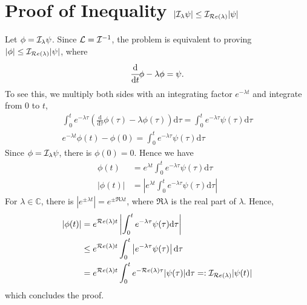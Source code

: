 \section{Proof of Inequality $|\mathcal{I}_\lambda \psi| \leq \mathcal{I}_{\mathcal{R}e\left(\lambda\right)}|\psi|$}
    Let $\phi = \mathcal{I}_\lambda \psi$. Since $\mathcal{L} = \mathcal{I}^{-1}$, the problem is equivalent to proving $|\phi| \leq \mathcal{I}_{\mathcal{R}e\left(\lambda\right)}|\psi|$, where
    \begin{equation}
        \cfrac{\mathrm{d} }{\mathrm{d} t}\phi-\lambda\phi = \psi.
    \end{equation}
    To see this, we multiply both sides with an integrating factor $e^{-\lambda t}$ and integrate from $0$ to $t$,
    \begin{gather}
        \int_{0}^{t} e^{-\lambda \tau} \left(\frac{\mathrm{d}}{\mathrm{d}\tau}\phi(\tau)-\lambda\phi(\tau)\right)\mathrm{d}\tau = \int_{0}^{t} e^{-\lambda \tau}\psi(\tau) \mathrm{d}\tau\\
        e^{-\lambda t}\phi(t) - \phi(0) = \int_{0}^{t} e^{-\lambda \tau}\psi(\tau) \mathrm{d}\tau
    \end{gather}
    Since $\phi = \mathcal{I}_{\lambda} \psi$, there is $\phi(0) = 0$. Hence we have
    \begin{align}
        \phi(t) &= e^{\lambda t}\int_{0}^{t} e^{-\lambda \tau}\psi(\tau) \mathrm{d}\tau \\
        |\phi(t)| &= \left|e^{\lambda t}\int_{0}^{t} e^{-\lambda \tau}\psi(\tau) \mathrm{d}\tau\right|
    \end{align}
    For $\lambda \in \mathbb{C}$, there is $\left|e^{\pm \lambda t}\right| = e^{\pm \Re{\lambda} t}$, where $\Re{\lambda}$ is the real part of $\lambda$.
    Hence,
    \begin{align}
        |\phi(t)| &= e^{\mathcal{R}e\left(\lambda\right) t} \left|\int_{0}^{t} e^{-\lambda \tau}\psi(\tau) \mathrm{d}\tau \right| \\
        &\leq e^{\mathcal{R}e\left(\lambda\right) t} \int_{0}^{t} \left|e^{-\lambda \tau}\psi(\tau) \right|\mathrm{d}\tau  \\
        &=e^{\mathcal{R}e\left(\lambda\right) t} \int_{0}^{t} e^{-\mathcal{R}e\left(\lambda\right) \tau}|\psi(\tau)|\mathrm{d}\tau =: \mathcal{I}_{\mathcal{R}e\left(\lambda\right)}|\psi(t)|
    \end{align}
    which concludes the proof.